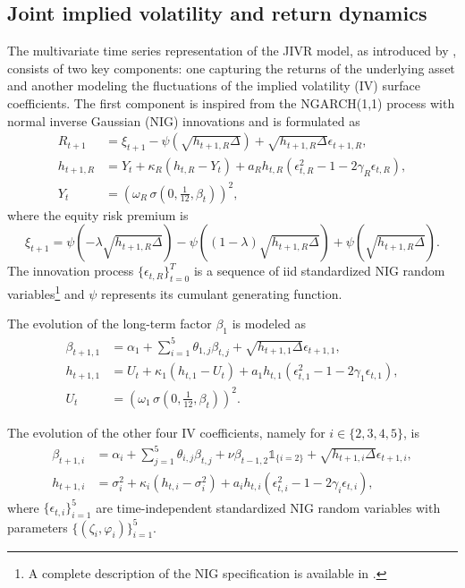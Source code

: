 \documentclass[12pt]{article}
\begin{document}
\subsection{Joint implied volatility and return dynamics}\label{subappen:JIVR_timeseries}

The multivariate time series representation of the JIVR model, as introduced by \cite{Frnacois2023}, consists of two key components: one capturing the returns of the underlying asset and another modeling the fluctuations of the implied volatility (IV) surface coefficients. The first component is inspired from the NGARCH(1,1) process with normal inverse Gaussian (NIG) innovations and is formulated as
\begin{align*}
    R_{t+1} &= \xi_{t+1} - \psi(\sqrt{h_{t+1,R}\Delta}) + \sqrt{h_{t+1,R}\Delta}\epsilon_{t+1,R}, \nonumber \\
    h_{t+1,R} &= Y_t + \kappa_R(h_{t,R} - Y_t) + a_R h_{t,R}(\epsilon_{t,R}^2 - 1 - 2\gamma_R \epsilon_{t,R}), \\
    Y_t &= \left( \omega_R \, \sigma \left(0, \frac{1}{12}, \beta_t \right) \right)^2, \nonumber
\end{align*}
where the equity risk premium is
\begin{equation*}
    \xi_{t+1} = \psi(-\lambda \sqrt{h_{t+1,R}\Delta}) - \psi((1-\lambda) \sqrt{h_{t+1,R}\Delta}) + \psi(\sqrt{h_{t+1,R}\Delta}).
\end{equation*}
The innovation process $\{\epsilon_{t,R}\}^T_{t=0}$ is a sequence of iid standardized NIG random variables\footnote{A complete description of the NIG specification is available in \cite{Frnacois2023}.} 
and $\psi$ represents its cumulant generating function.

The evolution of the long-term factor \(\beta_1\) is modeled as
\begin{align*}
    \beta_{t+1,1} &= \alpha_1 + \sum_{i=1}^{5} \theta_{1,j} \beta_{t,j} + \sqrt{h_{t+1,1}\Delta} \epsilon_{t+1,1}, \nonumber \\
    h_{t+1,1} &= U_t + \kappa_1(h_{t,1} - U_t) + a_1 h_{t,1}(\epsilon_{t,1}^2 - 1 - 2\gamma_1 \epsilon_{t,1}), \\
    U_t &= \left( \omega_1  \, \sigma \!\left( 0, \frac{1}{12}, \beta_t \right) \right)^2. \nonumber
\end{align*}

The evolution of the other four IV coefficients, namely for \(i \in \{2, 3, 4, 5\}\), is
\begin{align*}
    \beta_{t+1,i} &= \alpha_i + \sum_{j=1}^{5} \theta_{i,j} \beta_{t,j} + \nu \beta_{t-1,2} \mathds{1}_{\{i=2\}} + \sqrt{h_{t+1,i}\Delta} \epsilon_{t+1,i}, \nonumber \\
    h_{t+1,i} &= \sigma_i^2 + \kappa_i(h_{t,i} - \sigma_i^2) + a_i h_{t,i}(\epsilon_{t,i}^2 - 1 - 2\gamma_i \epsilon_{t,i}),
\end{align*}
where \(\{\epsilon_{t,i} \}_{i=1}^{5}\) are time-independent standardized NIG random variables with parameters \(\{ (\zeta_i, \varphi_i) \}_{i=1}^{5}\). 
\end{document}
